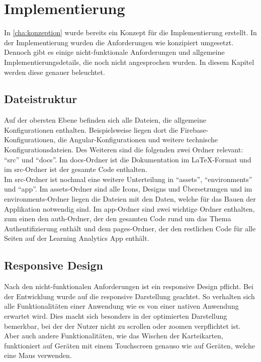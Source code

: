\chapter{Implementierung}

In \autoref{cha:konzeption} wurde bereits ein Konzept für die Implementierung erstellt. In der Implementierung wurden die Anforderungen wie konzipiert umgesetzt.
Dennoch gibt es einige nicht-funktionale Anforderungen und allgemeine Implementierungsdetails, die noch nicht angesprochen wurden. In diesem Kapitel werden diese genauer beleuchtet.

\section{Dateistruktur}

Auf der obersten Ebene befinden sich alle Dateien, die allgemeine Konfigurationen enthalten. Beispielsweise liegen dort die Firebase-Konfigurationen, die Angular-Konfigurationen und 
weitere technische Konfigurationsdateien. Des Weiteren sind die folgenden zwei Ordner relevant: \enquote{src} und \enquote{docs}. Im docs-Ordner ist die Dokumentation im \LaTeX-Format 
und im src-Ordner ist der gesamte Code enthalten. \\
Im src-Ordner ist nochmal eine weitere Unterteilung in \enquote{assets}, \enquote{environments} und \enquote{app}. Im assets-Ordner sind alle Icons, Designs und Übersetzungen und im environments-Ordner 
liegen die Dateien mit den Daten, welche für das Bauen der Applikation notwendig sind. Im app-Ordner sind zwei wichtige Ordner enthalten, zum einen den auth-Ordner, der den gesamten Code rund um das 
Thema Authentifizierung enthält und dem pages-Ordner, der den restlichen Code für alle Seiten auf der Learning Analytics App enthält. \\

\section{Responsive Design} %
Nach den nicht-funktionalen Anforderungen ist ein responsive Design pflicht.  
Bei der Entwicklung wurde auf die responsive Darstellung geachtet.
So verhalten sich alle Funktionalitäten einer Anwendung wie es von einer nativen Anwendung erwartet wird.
Dies macht sich besonders in der optimierten Darstellung bemerkbar, bei der der Nutzer nicht zu scrollen oder zoomen verpflichtet ist.
Aber auch andere Funktionalitäten, wie das Wischen der Karteikarten, funktioniert auf Geräten mit einem Touchscreen genauso wie auf Geräten, welche eine Maus verwenden.


